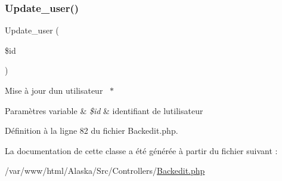 \subsubsection{\texorpdfstring{Update\+\_\+user()}{Update\_user()}}
{\footnotesize\ttfamily Update\+\_\+user (\begin{DoxyParamCaption}\item[{}]{\$id }\end{DoxyParamCaption})}

Mise à jour d\textquotesingle{}un utilisateur  $\ast$
\begin{DoxyParams}[1]{Paramètres}
variable & {\em \$id} & identifiant de l\textquotesingle{}utilisateur \\
\hline
\end{DoxyParams}


Définition à la ligne 82 du fichier Backedit.\+php.



La documentation de cette classe a été générée à partir du fichier suivant \+:\begin{DoxyCompactItemize}
\item 
/var/www/html/\+Alaska/\+Src/\+Controllers/\hyperlink{_backedit_8php}{Backedit.\+php}\end{DoxyCompactItemize}
